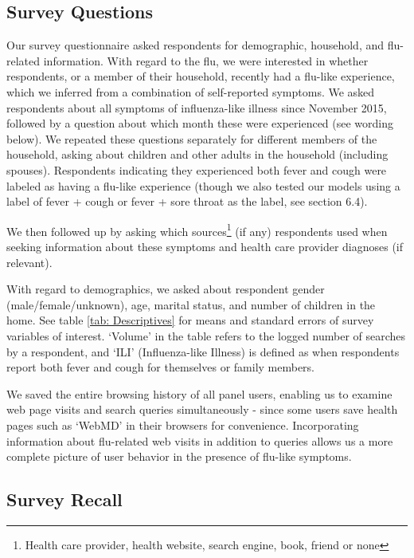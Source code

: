 \documentclass[12pt]{article}
\begin{document}
\subsection{Survey Questions}

Our survey questionnaire asked respondents for demographic, household, and flu-related information. With regard to the flu, we were interested in whether respondents, or a member of their household, recently had a flu-like experience, which we inferred from a combination of self-reported symptoms. We asked respondents about all symptoms of influenza-like illness since November 2015, followed by a question about which month these were experienced (see wording below). We repeated these questions separately for different members of the household, asking about children and other adults in the household (including spouses). Respondents indicating they experienced both fever and cough were labeled as having a flu-like experience (though we also tested our models using a label of fever + cough or fever + sore throat as the label, see section 6.4).

We then followed up by asking which sources\footnote{Health care provider, health website, search engine, book, friend or none} (if any) respondents used when seeking information about these symptoms and health care provider diagnoses (if relevant). %

With regard to demographics, we asked about respondent gender (male/female/unknown), age, marital status, and number of children in the home. See table \ref{tab: Descriptives} for means and standard errors of survey variables of interest. `Volume' in the table refers to the logged number of searches by a respondent, and `ILI' (Influenza-like Illness) is defined as when respondents report both fever and cough for themselves or family members.

We saved the entire browsing history of all panel users, enabling us to examine web page visits and search queries simultaneously - since some users save health pages such as `WebMD' in their browsers for convenience. Incorporating information about flu-related web visits in addition to queries allows us a more complete picture of user behavior in the presence of flu-like symptoms.

\subsection{Survey Recall}
\end{document}
